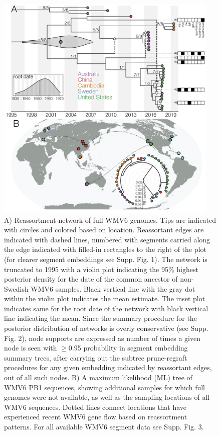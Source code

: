 \documentclass[11pt,twocolumn]{article}
\begin{document}
\begin{figure}
  \centering
  \includegraphics[width=0.95\textwidth]{Fig1_tracking.png}
  \caption{
    A) Reassortment network of full WMV6 genomes. Tips are indicated with circles and colored based on location. Reassortant edges are indicated with dashed lines, numbered with segments carried along the edge indicated with filled-in rectangles to the right of the plot (for clearer segment embeddings see Supp. Fig. 1). The network is truncated to 1995 with a violin plot indicating the 95\% highest posterior density for the date of the common ancestor of non-Swedish WMV6 samples. Black vertical line with the gray dot within the violin plot indicates the mean estimate. The inset plot indicates same for the root date of the network with black vertical line indicating the mean. Since the summary procedure for the posterior distribution of networks is overly conservative (see Supp. Fig. 2), node supports are expressed as number of times a given node is seen with $\geq$0.95 probability in segment embedding summary trees, after carrying out the subtree prune-regraft procedures for any given embedding indicated by reassortant edges, out of all such nodes.
    B) A maximum likelihood (ML) tree of WMV6 PB1 sequences, showing additional samples for which full genomes were not available, as well as the sampling locations of all WMV6 sequences. Dotted lines connect locations that have experienced recent WMV6 gene flow based on reassortment patterns. For all available WMV6 segment data see Supp. Fig. 3.
    }
    \label{fig:tracking}
\end{figure}
\end{document}
